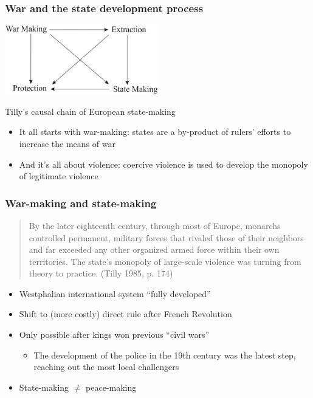 \documentclass[utf8, xcolor=dvipsnames, handout]{beamer}
\begin{document}
\begin{frame}
\frametitle{War and the state development process}
\centering

\includegraphics[width = 0.5\textwidth]{img/tilly_causal_chain}

\vspace{20pt}

{\small Tilly's causal chain of European state-making}

\vspace{20pt}

\begin{itemize}
  \item It all starts with war-making: states are a by-product of rulers' efforts to increase the means of war
  \item And it's all about violence: coercive violence is used to develop the monopoly of legitimate violence
\end{itemize}

\end{frame}

\begin{frame}
\frametitle{War-making and state-making}
\centering

\begin{quote}
  By the later eighteenth century, through most of Europe, monarchs controlled permanent, military forces that rivaled those of their neighbors and far exceeded any other organized armed force within their own territories. The state's monopoly of large-scale violence was turning from theory to practice. (Tilly 1985, p. 174)
\end{quote}

\begin{itemize}[<+->]
\item Westphalian international system ``fully developed''
\item Shift to (more costly) direct rule after French Revolution
\item Only possible after kings won previous ``civil wars''
  \begin{itemize}
    \item The development of the police in the 19th century was the latest step, reaching out the most local challengers
  \end{itemize}
\item State-making $\neq$ peace-making
\end{itemize}

\end{frame}
\end{document}
